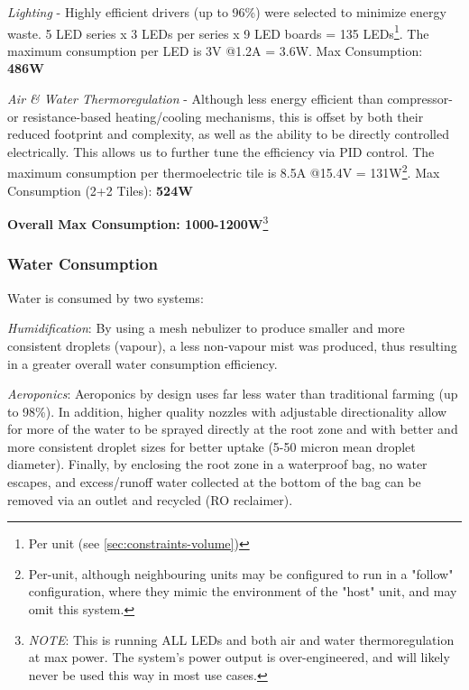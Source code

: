 \documentclass{report}
\begin{document}
\textit{Lighting} - Highly efficient drivers (up to 96\%) were selected to minimize energy waste. 5 LED series x 3 LEDs per series x 9 LED boards = 135 LEDs\footnote{Per unit (see \ref{sec:constraints-volume})}. The maximum consumption per LED is 3V @1.2A = 3.6W. Max Consumption: \textbf{486W}\footnotemark[1]

\textit{Air \& Water Thermoregulation} - Although less energy efficient than compressor- or resistance-based heating/cooling mechanisms, this is offset by both their reduced footprint and complexity, as well as the ability to be directly controlled electrically. This allows us to further tune the efficiency via PID control. The maximum consumption per thermoelectric tile is 8.5A @15.4V = 131W\footnote{Per-unit, although neighbouring units may be configured to run in a "follow" configuration, where they mimic the environment of the "host" unit, and may omit this system.}. Max Consumption (2+2 Tiles\footnotemark[1]): \textbf{524W}

\textbf{Overall Max Consumption: 1000-1200W}\footnote{\textit{NOTE}: This is running ALL LEDs and both air and water thermoregulation at max power. The system's power output is over-engineered, and will likely never be used this way in most use cases.}
\newpage


\subsubsection{Water Consumption}
\label{sec:constraints-water}





Water is consumed by two systems:

\textit{Humidification}: By using a mesh nebulizer to produce smaller and more consistent droplets (vapour), a less non-vapour mist was produced, thus resulting in a greater overall water consumption efficiency.

\textit{Aeroponics}: Aeroponics by design uses far less water than traditional farming (up to 98\%). In addition, higher quality nozzles with adjustable directionality allow for more of the water to be sprayed directly at the root zone and with better and more consistent droplet sizes for better uptake (5-50 micron mean droplet diameter). Finally, by enclosing the root zone in a waterproof bag, no water escapes, and excess/runoff water collected at the bottom of the bag can be removed via an outlet and recycled (RO reclaimer).
\end{document}
